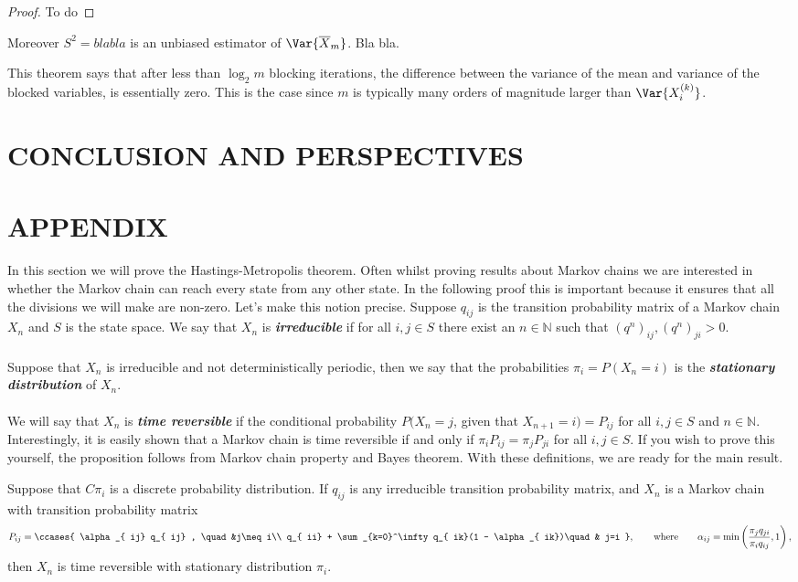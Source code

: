 \documentclass[11pt,english,a4paper]{article}
\begin{document}
\begin{proof}
To do
\end{proof}
Moreover $S^2 = bla bla$ is an unbiased estimator of $\Var{\overline X_m}$. Bla bla.

This theorem says that after less than $\log_2 m$ blocking iterations, the difference between the variance of the mean and variance of the blocked variables, is essentially zero. This is the case since $m$ is typically many orders of magnitude larger than $\Var{X^{(k)}_i}$.
\section*{\uppercase{Conclusion and perspectives}}
\section*{\uppercase{Appendix}}
In this section we will prove the Hastings-Metropolis theorem. Often whilst proving results about Markov chains we are interested in whether the Markov chain can reach every state from any other state. In the following proof this is important because it ensures that all the divisions we will make are non-zero. Let's make this notion precise. Suppose $q_{  ij}$ is the transition probability matrix of a Markov chain $X_n$ and $S$ is the state space. We say that $X_n$ is \textit{\textbf{irreducible}} if for all $i,j \in S$ there exist an $n \in \mathbb{N}$ such that $(q^n)_{  ij}, (q^n)_{  ji} > 0$.\\
\\
Suppose that $X_n$ is irreducible and not deterministically periodic, then we say that the probabilities $\pi_i = P(X_n = i)$ is the \textit{\textbf{stationary distribution}} of $X_n$.\\
\\
We will say that $X_n$ is \textit{\textbf{time reversible}} if the conditional probability $P(X_{n} = j$, given that $X_{n+1} = i) = P_{  ij}$ for all $i,j \in S$ and $n \in \mathbb{N}$. Interestingly, it is easily shown that a Markov chain is time reversible if and only if $\pi_i P_{  ij} = \pi_j P_{  ji}$ for all $i,j \in S$. If you wish to prove this yourself, the proposition follows from Markov chain property and Bayes theorem. With these definitions, we are ready for the main result.
\begin{theorem*}
Suppose that $C\pi_i$ is a discrete probability distribution. If $q_{ij}$ is any irreducible transition probability matrix, and $X_n$ is a Markov chain with transition probability matrix 
\begin{equation}
P_{ij} = \ccases {
\alpha_{  ij} q_{  ij} , \quad &j\neq i\\
q_{  ii} + \sum_{k=0}^\infty q_{  ik}(1 - \alpha_{  ik})\quad & j=i
},\qquad \text{where} \qquad \alpha_{  ij} = \min \left( \frac{\pi_j q_{  ji}}{\pi_i q_{  ij}} , 1\right), \label{eq:metropolis}
\end{equation}
then $X_n$ is time reversible with stationary distribution $\pi_i$.
\end{theorem*}
\end{document}
